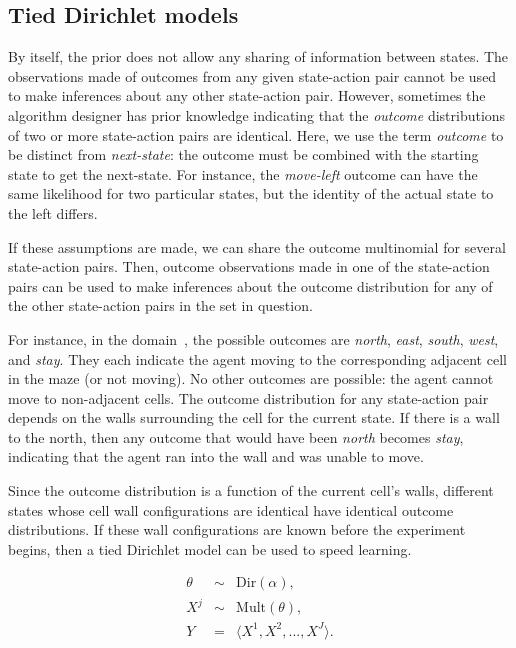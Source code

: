 \subsection{Tied Dirichlet models}

By itself, the  prior does not allow any sharing of information between states. The observations made of outcomes from any given state-action pair cannot be used to make inferences about any other state-action pair. However, sometimes the algorithm designer has prior knowledge indicating that the \emph{outcome} distributions of two or more state-action pairs are identical. Here, we use the term \emph{outcome} to be distinct from \emph{next-state}: the outcome must be combined with the starting state to get the next-state. For instance, the \emph{move-left} outcome can have the same likelihood for two particular states, but the identity of the actual state to the left differs.

If these assumptions are made, we can share the outcome multinomial for several state-action pairs. Then, outcome observations made in one of the state-action pairs can be used to make inferences about the outcome distribution for any of the other state-action pairs in the set in question.

For instance, in the  domain~\cite{leffler07}, the possible outcomes are \emph{north}, \emph{east}, \emph{south}, \emph{west}, and \emph{stay}. They each indicate the agent moving to the corresponding adjacent cell in the maze (or not moving). No other outcomes are possible: the agent cannot move to non-adjacent cells. The outcome distribution for any state-action pair depends on the walls surrounding the cell for the current state. If there is a wall to the north, then any outcome that would have been \emph{north} becomes \emph{stay}, indicating that the agent ran into the wall and was unable to move.

Since the outcome distribution is a function of the current cell's walls, different states whose cell wall configurations are identical have identical outcome distributions. If these wall configurations are known before the experiment begins, then a tied Dirichlet model can be used to speed learning.

\begin{eqnarray}
\theta &\sim& \mbox{Dir}(\alpha),\\
X^j &\sim& \mbox{Mult}(\theta),\\
Y &=& \langle X^1, X^2, ... , X^J \rangle.
\end{eqnarray}

